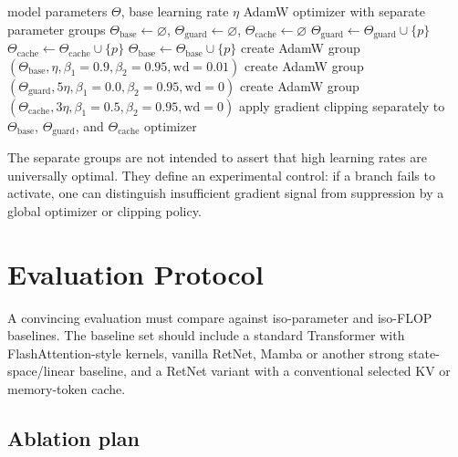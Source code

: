 \documentclass[11pt]{article}
\begin{document}
\begin{algorithm}[H]
\caption{Optimizer grouping for guarded memory branches}
\label{alg:optim}
\begin{algorithmic}[1]
\Require model parameters $\Theta$, base learning rate $\eta$
\Ensure AdamW optimizer with separate parameter groups
\State $\Theta_{\mathrm{base}}\gets\varnothing$, $\Theta_{\mathrm{guard}}\gets\varnothing$, $\Theta_{\mathrm{cache}}\gets\varnothing$
        \State $\Theta_{\mathrm{guard}}\gets\Theta_{\mathrm{guard}}\cup\{p\}$
        \State $\Theta_{\mathrm{cache}}\gets\Theta_{\mathrm{cache}}\cup\{p\}$
    \Else
        \State $\Theta_{\mathrm{base}}\gets\Theta_{\mathrm{base}}\cup\{p\}$
    \EndIf
\EndFor
\State create AdamW group $(\Theta_{\mathrm{base}},\eta,\beta_1=0.9,\beta_2=0.95,\mathrm{wd}=0.01)$
\State create AdamW group $(\Theta_{\mathrm{guard}},5\eta,\beta_1=0.0,\beta_2=0.95,\mathrm{wd}=0)$
\State create AdamW group $(\Theta_{\mathrm{cache}},3\eta,\beta_1=0.5,\beta_2=0.95,\mathrm{wd}=0)$
\State apply gradient clipping separately to $\Theta_{\mathrm{base}}$, $\Theta_{\mathrm{guard}}$, and $\Theta_{\mathrm{cache}}$
\State \Return optimizer
\end{algorithmic}
\end{algorithm}

The separate groups are not intended to assert that high learning rates are universally optimal. They define an experimental control: if a branch fails to activate, one can distinguish insufficient gradient signal from suppression by a global optimizer or clipping policy.

\section{Evaluation Protocol}
\label{sec:evaluation}

A convincing evaluation must compare against iso-parameter and iso-FLOP baselines. The baseline set should include a standard Transformer with FlashAttention-style kernels, vanilla RetNet, Mamba or another strong state-space/linear baseline, and a RetNet variant with a conventional selected KV or memory-token cache.

\subsection{Ablation plan}
\end{document}
